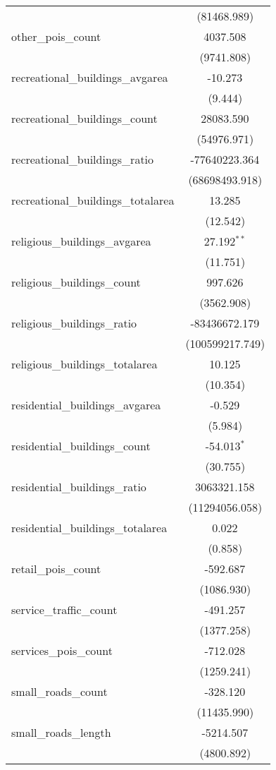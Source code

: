 \begin{table}[!htbp]
\begin{tabular}{@{\extracolsep{5pt}}lc}
  & (81468.989) \\
 other_pois_count & 4037.508$^{}$ \\
  & (9741.808) \\
 recreational_buildings_avgarea & -10.273$^{}$ \\
  & (9.444) \\
 recreational_buildings_count & 28083.590$^{}$ \\
  & (54976.971) \\
 recreational_buildings_ratio & -77640223.364$^{}$ \\
  & (68698493.918) \\
 recreational_buildings_totalarea & 13.285$^{}$ \\
  & (12.542) \\
 religious_buildings_avgarea & 27.192$^{**}$ \\
  & (11.751) \\
 religious_buildings_count & 997.626$^{}$ \\
  & (3562.908) \\
 religious_buildings_ratio & -83436672.179$^{}$ \\
  & (100599217.749) \\
 religious_buildings_totalarea & 10.125$^{}$ \\
  & (10.354) \\
 residential_buildings_avgarea & -0.529$^{}$ \\
  & (5.984) \\
 residential_buildings_count & -54.013$^{*}$ \\
  & (30.755) \\
 residential_buildings_ratio & 3063321.158$^{}$ \\
  & (11294056.058) \\
 residential_buildings_totalarea & 0.022$^{}$ \\
  & (0.858) \\
 retail_pois_count & -592.687$^{}$ \\
  & (1086.930) \\
 service_traffic_count & -491.257$^{}$ \\
  & (1377.258) \\
 services_pois_count & -712.028$^{}$ \\
  & (1259.241) \\
 small_roads_count & -328.120$^{}$ \\
  & (11435.990) \\
 small_roads_length & -5214.507$^{}$ \\
  & (4800.892) \\

\end{tabular}
\end{table}
